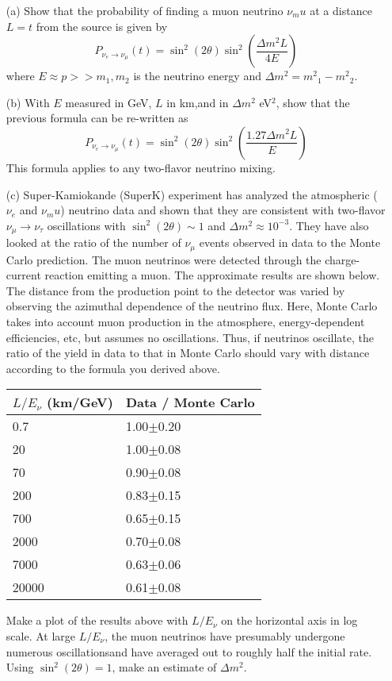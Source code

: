 \documentclass[12pt]{article}
\begin{document}
\begin{enumerate}
\item[(a)] Show that the probability of finding a muon neutrino $\nu_mu$
at a distance $L=t$ from the source is given by
$$
P_{\nu_e\rightarrow \nu_\mu}(t) = \sin^2\left (2\theta\right )
\sin^2\left (\frac{\Delta m^2 L}{4E}\right )
$$
where $E\approx p >>m_1,m_2$ is the neutrino energy and
$\Delta m^2 = {m^2}_1 - {m^2}_2$.
\item[(b)] With $E$ measured in GeV, $L$ in km,and in $\Delta m^2$ eV$^2$,
show that the previous formula can be re-written as
$$
P_{\nu_e\rightarrow \nu_\mu}(t) = \sin^2\left (2\theta \right )
\sin^2 \left (\frac{1.27 \Delta m^2 L}{E} \right )
$$
This formula applies to any two-flavor neutrino mixing.
\item[(c)] Super-Kamiokande (SuperK) experiment has analyzed
the atmospheric ($\nu_e$ and $\nu_mu$) neutrino data and
shown that they are consistent with
two-flavor $\nu_\mu \rightarrow \nu_\tau $ oscillations with
$\sin^2(2\theta)\sim1$ and $\Delta m^2\approx 10^{-3}$.
They have also looked at the ratio of the number of
$\nu_\mu$ events observed in data to the Monte Carlo prediction.
The muon neutrinos were detected through the charge-current reaction
emitting a muon. The approximate results are shown below.
The distance from the production point to the detector was varied by
observing the azimuthal dependence of the neutrino flux. Here,
Monte Carlo  takes into account
muon production in the atmosphere, energy-dependent efficiencies,
etc, but assumes no oscillations.
Thus, if neutrinos oscillate, the ratio of the yield
in data to that in Monte Carlo should vary with distance
according to the formula you derived above.
\begin{center}
  \begin{tabular}{|l|l|}
    \hline
  $L/E_\nu$ (km/GeV) & Data / Monte Carlo\\
 \hline
 0.7& 1.00$\pm$0.20 \\
20 & 1.00$\pm$0.08\\
70 & 0.90$\pm$0.08\\
200 & 0.83$\pm$0.15\\
700& 0.65$\pm$0.15\\
2000& 0.70$\pm$0.08\\
7000& 0.63$\pm$0.06\\
20000& 0.61$\pm$0.08\\
\hline
\end{tabular}
\end{center}
Make a plot of the results above with $L/E_\nu$ on the horizontal
axis in log scale. At large $L/E_\nu$, the muon neutrinos have
presumably undergone numerous oscillationsand have averaged out to
roughly half the initial rate.  Using
$\sin^2\left (2\theta \right ) = 1$, make an estimate of $\Delta m^2$.
\end{enumerate}
\end{document}
